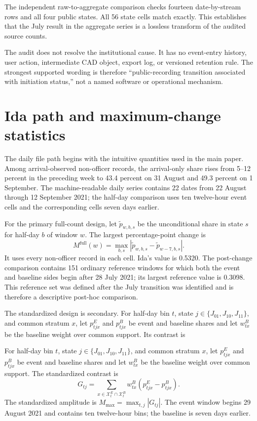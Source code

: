 \documentclass[11pt]{article}
\begin{document}
The independent raw-to-aggregate comparison checks fourteen date-by-stream rows and all four public states. All 56 state cells match exactly. This establishes that the July result in the aggregate series is a lossless transform of the audited source counts.

The audit does not resolve the institutional cause. It has no event-entry history, user action, intermediate CAD object, export log, or versioned retention rule. The strongest supported wording is therefore ``public-recording transition associated with initiation status,'' not a named software or operational mechanism.

\section{Ida path and maximum-change statistics}

The daily file path begins with the intuitive quantities used in the main paper. Among arrival-observed non-officer records, the arrival-only share rises from 5--12 percent in the preceding week to 43.4 percent on 31 August and 49.3 percent on 1 September. The machine-readable daily series contains 22 dates from 22 August through 12 September 2021; the half-day comparison uses ten twelve-hour event cells and the corresponding cells seven days earlier.

For the primary full-count design, let $\widetilde p_{w,b,s}$ be the unconditional share in state $s$ for half-day $b$ of window $w$. The largest percentage-point change is
\begin{equation}
M^{\mathrm{full}}(w)=\max_{b,s}\left|\widetilde p_{w,b,s}-\widetilde p_{w-7,b,s}\right|.
\end{equation}
It uses every non-officer record in each cell. Ida's value is 0.5320. The post-change comparison contains 151 ordinary reference windows for which both the event and baseline sides begin after 28 July 2021; its largest reference value is 0.3098. This reference set was defined after the July transition was identified and is therefore a descriptive post-hoc comparison.

The standardized design is secondary. For half-day bin $t$, state $j\in\{J_{01},J_{10},J_{11}\}$, and common stratum $x$, let $p^E_{tjx}$ and $p^B_{tjx}$ be event and baseline shares and let $w^B_{tx}$ be the baseline weight over common support. Its contrast is

For half-day bin $t$, state $j\in\{J_{01},J_{10},J_{11}\}$, and common stratum $x$, let $p^E_{tjx}$ and $p^B_{tjx}$ be event and baseline shares and let $w^B_{tx}$ be the baseline weight over common support. The standardized contrast is
\begin{equation}
G_{tj}=\sum_{x\in\mathcal X_t^E\cap\mathcal X_t^B}w^B_{tx}(p^E_{tjx}-p^B_{tjx}).
\end{equation}
The standardized amplitude is $M_{\max}=\max_{t,j}|G_{tj}|$. The event window begins 29 August 2021 and contains ten twelve-hour bins; the baseline is seven days earlier.
\end{document}
